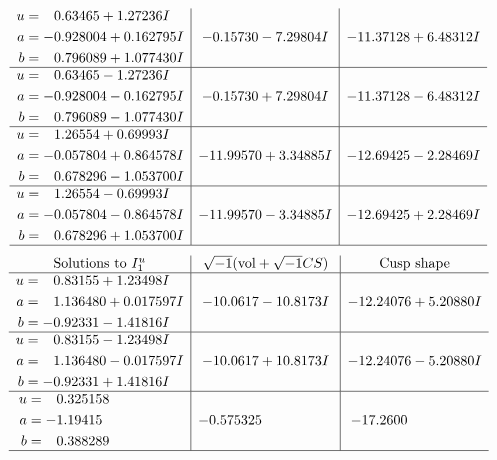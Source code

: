 \documentclass[1p]{elsarticle_modified}
\theoremstyle{definition}
\newcommand{\I}{\sqrt{-1}}
\begin{document}
$$\begin{array}{c|c|c}
\begin{aligned}
u &= \phantom{-}0.63465 + 1.27236 I \\
a &= -0.928004 + 0.162795 I \\
b &= \phantom{-}0.796089 + 1.077430 I\end{aligned}
 & -0.15730 - 7.29804 I & -11.37128 + 6.48312 I \\ \hline\begin{aligned}
u &= \phantom{-}0.63465 - 1.27236 I \\
a &= -0.928004 - 0.162795 I \\
b &= \phantom{-}0.796089 - 1.077430 I\end{aligned}
 & -0.15730 + 7.29804 I & -11.37128 - 6.48312 I \\ \hline\begin{aligned}
u &= \phantom{-}1.26554 + 0.69993 I \\
a &= -0.057804 + 0.864578 I \\
b &= \phantom{-}0.678296 - 1.053700 I\end{aligned}
 & -11.99570 + 3.34885 I & -12.69425 - 2.28469 I \\ \hline\begin{aligned}
u &= \phantom{-}1.26554 - 0.69993 I \\
a &= -0.057804 - 0.864578 I \\
b &= \phantom{-}0.678296 + 1.053700 I\end{aligned}
 & -11.99570 - 3.34885 I & -12.69425 + 2.28469 I\\
 \hline 
 \end{array}$$\newpage$$\begin{array}{c|c|c}  
\text{Solutions to }I^u_{1}& \I (\text{vol} + \sqrt{-1}CS) & \text{Cusp shape}\\
 \hline 
\begin{aligned}
u &= \phantom{-}0.83155 + 1.23498 I \\
a &= \phantom{-}1.136480 + 0.017597 I \\
b &= -0.92331 - 1.41816 I\end{aligned}
 & -10.0617 - 10.8173 I & -12.24076 + 5.20880 I \\ \hline\begin{aligned}
u &= \phantom{-}0.83155 - 1.23498 I \\
a &= \phantom{-}1.136480 - 0.017597 I \\
b &= -0.92331 + 1.41816 I\end{aligned}
 & -10.0617 + 10.8173 I & -12.24076 - 5.20880 I \\ \hline\begin{aligned}
u &= \phantom{-}0.325158\phantom{ +0.000000I} \\
a &= -1.19415\phantom{ +0.000000I} \\
b &= \phantom{-}0.388289\phantom{ +0.000000I}\end{aligned}
 & -0.575325\phantom{ +0.000000I} & -17.2600\phantom{ +0.000000I}\\
 \hline 
 \end{array}$$\newpage\newpage\renewcommand{\arraystretch}{1}
\end{document}
